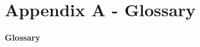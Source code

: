 \chapter*{Appendix A - Glossary}
\begin{center}
\Large\textbf{Glossary }  

\end{center}
\begin{center}

\end{center}
